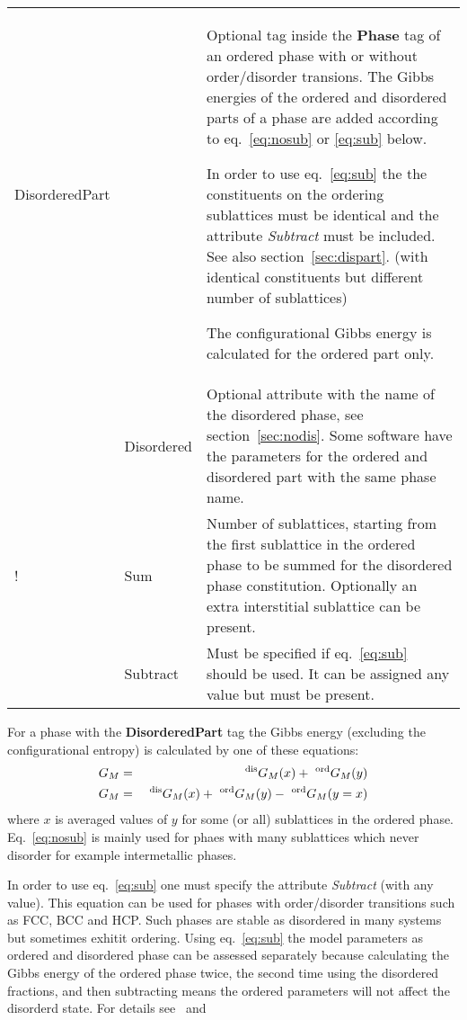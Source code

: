 \documentclass{article}
\begin{document}
\begin{tabular}{|p{} p{} p{}|}
  DisorderedPart & & Optional tag inside the {\bf Phase} tag of an 
              ordered phase with or without order/disorder transions.
              The Gibbs energies of the ordered and disordered parts
              of a phase are added according to eq.~\ref{eq:nosub} or
              \ref{eq:sub} below.

              In order to use eq.~\ref{eq:sub} the the constituents on
              the ordering sublattices must be identical and the
              attribute {\em Subtract} must be included.  See also
              section~\ref{sec:dispart}.  (with identical constituents
              but different number of sublattices)

              The configurational Gibbs energy is calculated for
              the ordered part only.  \\

   & Disordered & Optional attribute with the name of the disordered phase, 
            see section~\ref{sec:nodis}.  Some software have the parameters
            for the ordered and disordered part with the same phase name.\\

!  & Sum & Number of sublattices, starting from the first sublattice in the
              ordered phase to be summed for the disordered phase
              constitution.  Optionally an extra interstitial
              sublattice can be present.\\

   & Subtract & Must be specified if eq.~\ref{eq:sub} should be used.
                It can be assigned any value but must be present.\\\hline
\end{tabular}

\bigskip
For a phase with the {\bf DisorderedPart} tag the Gibbs energy
(excluding the configurational entropy) is calculated by one of these
equations:
\begin{eqnarray}
G_M &=& ~^{\rm dis}G_M(x) + ~^{\rm ord}G_M(y) \label{eq:nosub}\\
G_M &=& ~^{\rm dis}G_M(x) + ~^{\rm ord}G_M(y) - ~^{\rm ord}G_M(y=x) \label{eq:sub}
\end{eqnarray}
where $x$ is averaged values of $y$ for some (or all) sublattices in
the ordered phase.  Eq.~\ref{eq:nosub} is mainly used for phaes with
many sublattices which never disorder for example intermetallic
phases.

In order to use eq.~\ref{eq:sub} one must specify the attribute {\em
  Subtract} (with any value).  This equation can be used for phases
with order/disorder transitions such as FCC, BCC and HCP.  Such phases
are stable as disordered in many systems but sometimes exhitit
ordering.  Using eq.~\ref{eq:sub} the model parameters as ordered and
disordered phase can be assessed separately because calculating the
Gibbs energy of the ordered phase twice, the second time using the
disordered fractions, and then subtracting means the ordered
parameters will not affect the disorderd state.  For details
see~\cite{97Ans} and~\cite{07Hal}
\end{document}
